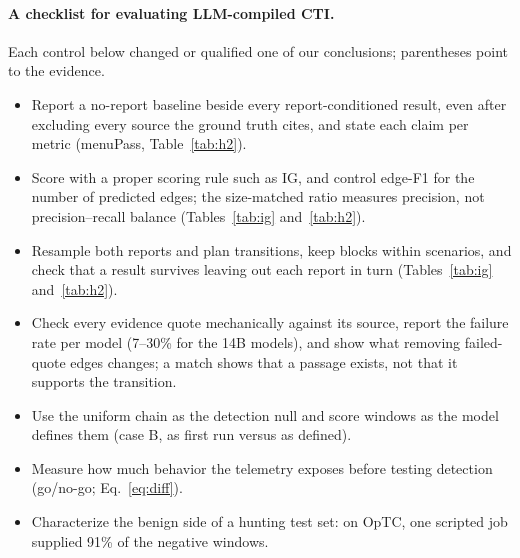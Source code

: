 \documentclass[letterpaper]{article}
\begin{document}
\paragraph{A checklist for evaluating LLM-compiled CTI.} Each control below changed or qualified one of our conclusions; parentheses point to the evidence.
\begin{itemize}
\item Report a no-report baseline beside every report-conditioned result, even after excluding every source the ground truth cites, and state each claim per metric (menuPass, Table~\ref{tab:h2}).
\item Score with a proper scoring rule such as IG, and control edge-F1 for the number of predicted edges; the size-matched ratio measures precision, not precision--recall balance (Tables~\ref{tab:ig} and~\ref{tab:h2}).
\item Resample both reports and plan transitions, keep blocks within scenarios, and check that a result survives leaving out each report in turn (Tables~\ref{tab:ig} and~\ref{tab:h2}).
\item Check every evidence quote mechanically against its source, report the failure rate per model (7--30\% for the 14B models), and show what removing failed-quote edges changes; a match shows that a passage exists, not that it supports the transition.
\item Use the uniform chain as the detection null and score windows as the model defines them (case B, as first run versus as defined).
\item Measure how much behavior the telemetry exposes before testing detection (go/no-go; Eq.~\eqref{eq:diff}).
\item Characterize the benign side of a hunting test set: on OpTC, one scripted job supplied 91\% of the negative windows.
\end{itemize}
\end{document}
